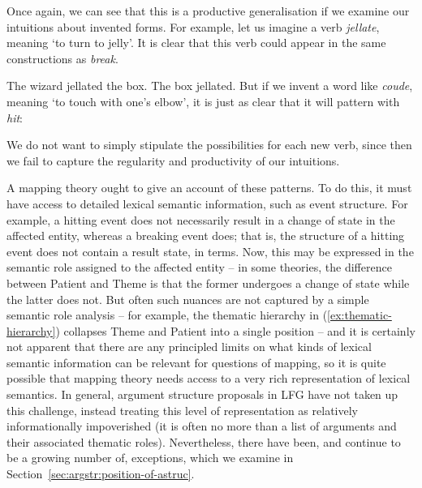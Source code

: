 \documentclass[output=paper]{langscibook}
\begin{document}
%
\begin{exe}
\ex\label{ex:break-class}
\begin{xlist}
\end{xlist}
%
\ex\label{ex:hit-class}
\begin{xlist}
\end{xlist}
\end{exe}
%
Once again, we can see that this is a productive generalisation if we examine
our intuitions about invented forms. For example, let us imagine a verb
\textit{jellate}, meaning `to turn to jelly'. It is clear that this verb could
appear in the same constructions as \textit{break}.

\ea
\ea The wizard jellated the box.
\ex The box jellated.
\z
\z
%
But if we invent a word like \textit{coude}, meaning `to touch with one's
elbow', it is just as clear that it will pattern with \textit{hit}:

\ea
{}
\z
\z
%
We do not want to simply stipulate the possibilities for each new verb, since
then we fail to capture the regularity and productivity of our intuitions.

A mapping theory ought to give an account of these patterns. To do this, it must
have access to detailed lexical semantic information, such as event structure.
For example, a hitting event does not necessarily result in a change of state in
the affected entity, whereas a breaking event does; that is, the structure of a
hitting event does not contain a result state, in  terms.
Now, this may be expressed in the semantic role assigned to the affected entity
-- in some theories, the difference between Patient and Theme is that the former
undergoes a change of state while the latter does not. But often such nuances
are not captured by a simple semantic role analysis -- for example, the thematic
hierarchy in (\ref{ex:thematic-hierarchy}) collapses Theme and Patient into a
single position -- and it is certainly not apparent that there are any
principled limits on what kinds of lexical semantic information can be relevant
for questions of mapping, so it is quite possible that mapping theory needs
access to a very rich representation of lexical semantics. In general, argument
structure proposals in LFG have not taken up this challenge, instead treating
this level of representation as relatively informationally impoverished (it is
often no more than a list of arguments and their associated thematic roles).
Nevertheless, there have been, and continue to be a growing number of,
exceptions, which we examine in Section~\ref{sec:argstr:position-of-astruc}.
\end{document}
